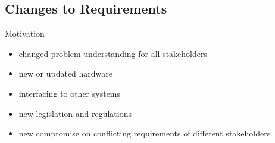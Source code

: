 \subsection{Changes to Requirements}
\begin{frame}{\insertsubsection}
	\begin{fancycolumns}
		\begin{note}{Motivation \mysource{\sommerville}}
			\begin{itemize}
				\item changed problem understanding for all stakeholders
				\item new or updated hardware
				\item interfacing to other systems
				\item new legislation and regulations
				\item new compromise on conflicting requirements of different stakeholders
			\end{itemize}
		\end{note}
	\end{fancycolumns}
\end{frame}

%

